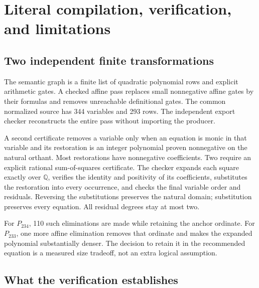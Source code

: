 \documentclass[11pt,a4paper]{article}
\theoremstyle{remark}
\begin{document}
\section{Literal compilation, verification, and limitations}

\subsection{Two independent finite transformations}

The semantic graph is a finite list of quadratic polynomial rows and
explicit arithmetic gates. A checked affine pass replaces small nonnegative
affine gates by their formulas and removes unreachable definitional gates.
The common normalized source has 344 variables and 293 rows. The independent
export checker reconstructs the entire pass without importing the producer.

A second certificate removes a variable only when an equation is monic in
that variable and its restoration is an integer polynomial proven
nonnegative on the natural orthant. Most restorations have nonnegative
coefficients. Two require an explicit rational sum-of-squares certificate.
The checker expands each square exactly over \(\mathbb Q\), verifies the
identity and positivity of its coefficients, substitutes the restoration
into every occurrence, and checks the final variable order and residuals.
Reversing the substitutions preserves the natural domain; substitution
preserves every equation. All residual degrees stay at most two.

For \(P_{234}\), 110 such eliminations are made while retaining the anchor
ordinate. For \(P_{233}\), one more affine elimination removes that
ordinate and makes the expanded polynomial substantially denser. The
decision to retain it in the recommended equation is a measured size
tradeoff, not an extra logical assumption.

\subsection{What the verification establishes}
\end{document}
